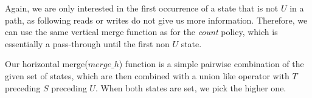 Again, we are only interested in the first occurrence of a state that is not $U$ in a path, as following reads or writes do not give us more information. 
Therefore, we can use the same vertical merge function as for the \emph{count} policy, which is essentially a pass-through until the first non $U$ state.

Our horizontal merge($merge\_h$) function is a simple pairwise combination of the given set of states, which are then combined with a union like 
operator with $T$ preceding $S$ preceding $U$. When both states are set, we pick the higher one.

%
%
%
